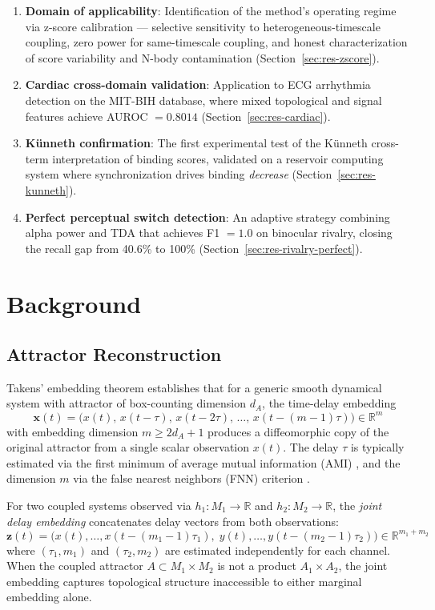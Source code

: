 \documentclass[11pt,a4paper]{article}
\begin{document}
\begin{enumerate}
    \item \textbf{Domain of applicability}: Identification of the method's operating regime via z-score calibration --- selective sensitivity to heterogeneous-timescale coupling, zero power for same-timescale coupling, and honest characterization of score variability and N-body contamination (Section~\ref{sec:res-zscore}).
    \item \textbf{Cardiac cross-domain validation}: Application to ECG arrhythmia detection on the MIT-BIH database, where mixed topological and signal features achieve AUROC $= 0.8014$ (Section~\ref{sec:res-cardiac}).
    \item \textbf{K\"unneth confirmation}: The first experimental test of the K\"unneth cross-term interpretation of binding scores, validated on a reservoir computing system where synchronization drives binding \emph{decrease} (Section~\ref{sec:res-kunneth}).
    \item \textbf{Perfect perceptual switch detection}: An adaptive strategy combining alpha power and TDA that achieves F1 $= 1.0$ on binocular rivalry, closing the recall gap from 40.6\% to 100\% (Section~\ref{sec:res-rivalry-perfect}).
\end{enumerate}


\section{Background}

\subsection{Attractor Reconstruction}

Takens' embedding theorem \citep{takens1981detecting} establishes that for a generic smooth dynamical system with attractor of box-counting dimension $d_A$, the time-delay embedding
\begin{equation}
    \mathbf{x}(t) = \bigl(x(t),\, x(t-\tau),\, x(t-2\tau),\, \ldots,\, x(t-(m-1)\tau)\bigr) \in \mathbb{R}^m
\end{equation}
with embedding dimension $m \geq 2d_A + 1$ produces a diffeomorphic copy of the original attractor from a single scalar observation $x(t)$.
The delay $\tau$ is typically estimated via the first minimum of average mutual information (AMI) \citep{fraser1986independent}, and the dimension $m$ via the false nearest neighbors (FNN) criterion \citep{kennel1992determining}.

For two coupled systems observed via $h_1: M_1 \to \mathbb{R}$ and $h_2: M_2 \to \mathbb{R}$, the \emph{joint delay embedding} concatenates delay vectors from both observations:
\begin{equation}
    \mathbf{z}(t) = \bigl(x(t), \ldots, x(t-(m_1-1)\tau_1),\; y(t), \ldots, y(t-(m_2-1)\tau_2)\bigr) \in \mathbb{R}^{m_1+m_2}
\end{equation}
where $(\tau_1, m_1)$ and $(\tau_2, m_2)$ are estimated independently for each channel.
When the coupled attractor $A \subset M_1 \times M_2$ is not a product $A_1 \times A_2$, the joint embedding captures topological structure inaccessible to either marginal embedding alone.
\end{document}
